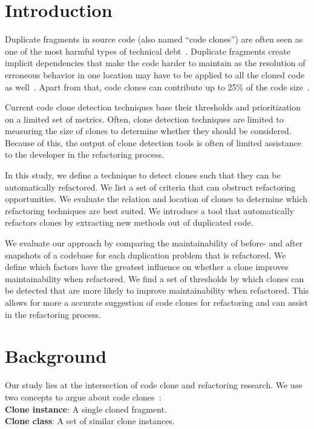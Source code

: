 \documentclass[sigconf,review, table]{acmart}
\begin{document}
\section{Introduction}
Duplicate fragments in source code (also named ``code clones'') are often seen as one of the most harmful types of technical debt~\cite{fowler2018refactoring}. Duplicate fragments create implicit dependencies that make the code harder to maintain as the resolution of erroneous behavior in one location may have to be applied to all the cloned code as well~\cite{ostberg2014automatically}. Apart from that, code clones can contribute up to 25\% of the code size~\cite{bruntink2005use}.

Current code clone detection techniques base their thresholds and prioritization on a limited set of metrics. Often, clone detection techniques are limited to measuring the size of clones to determine whether they should be considered. Because of this, the output of clone detection tools is often of limited assistance to the developer in the refactoring process.

In this study, we define a technique to detect clones such that they can be automatically refactored. We list a set of criteria that can obstruct refactoring opportunities. We evaluate the relation and location of clones to determine which refactoring techniques are best suited. We introduce a tool that automatically refactors clones by extracting new methods out of duplicated code.

We evaluate our approach by comparing the maintainability of before- and after snapshots of a codebase for each duplication problem that is refactored. We define which factors have the greatest influence on whether a clone improves maintainability when refactored. We find a set of thresholds by which clones can be detected that are more likely to improve maintainability when refactored. This allows for more a accurate suggestion of code clones for refactoring and can assist in the refactoring process.

\section{Background}
Our study lies at the intersection of code clone and refactoring research. We use two concepts to argue about code clones~\cite{roy2007survey}:
\\ \textbf{Clone instance}: A single cloned fragment.
\\ \textbf{Clone class}: A set of similar clone instances.
\end{document}
